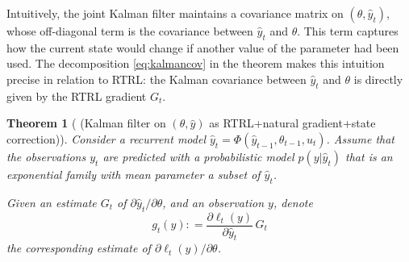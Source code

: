 \documentclass[11pt,a4paper]{article}
\newcommand{\deq}{\mathrel{\mathop{:}}=}
\newcommand{\1}{\mathbbm{1}}
\theoremstyle{yannthm}
\newtheorem{thm}[defi]{Theorem}
\theoremstyle{yannthm2}
\newcommand{\transf}{\Phi}
\numberwithin{equation}{section}
\begin{document}
Intuitively, the joint Kalman filter maintains a covariance matrix on
$(\theta,\hat y_t)$, whose
off-diagonal term is the covariance between $\hat y_t$ and $\theta$. This
term
captures how the current state would change if another value of the
parameter had been used. The decomposition \eqref{eq:kalmancov} in the
theorem makes this intuition precise in
relation to RTRL: the Kalman covariance between $\hat y_t$ and $\theta$ is
directly given by the RTRL gradient $G_t$.

\begin{thm}[ (Kalman filter on $(\theta,\hat y)$ as RTRL+natural
gradient+state correction)]%
\label{thm:rtrlkal}%
Consider a recurrent model $\hat y_t = \transf(\hat
y_{t-1},\theta_{t-1},u_t)$. Assume that the observations $y_t$ are
predicted with
a probabilistic model $p(y|\hat y_t)$ that is an exponential family
with mean parameter a subset of $\hat y_t$.

Given an estimate $G_t$ of $\partial \hat y_t/\partial \theta$, and an
observation $y$, denote
\begin{equation}
\label{eq:gradlossestim}
g_t(y)\deq \frac{\partial \ell_t(y)}{\partial\hat y_t} \, G_t
\end{equation}
the corresponding estimate of $\partial \ell_t(y)/\partial \theta$.


\end{thm}
\end{document}
